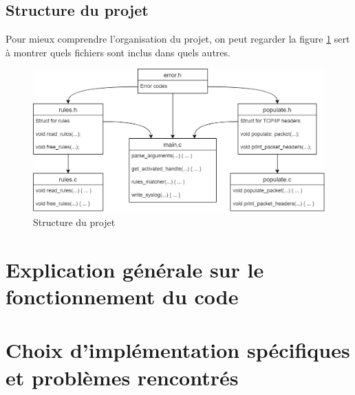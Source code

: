 \documentclass[a4paper]{article}
\begin{document}
\subsection{Structure du projet}



Pour mieux comprendre l'organisation du projet, on peut regarder la figure \ref{fig:structproj} sert à montrer quels fichiers sont inclus dans quels autres.

\begin{figure}[H]
    \includegraphics[width=0.99\linewidth]{../markdown-explanations/images/project-structure.png}
    \caption{Structure du projet}
    \label{fig:structproj}
\end{figure}










\section{Explication générale sur le fonctionnement du code}













\section{Choix d'implémentation spécifiques et problèmes rencontrés}



\end{document}
